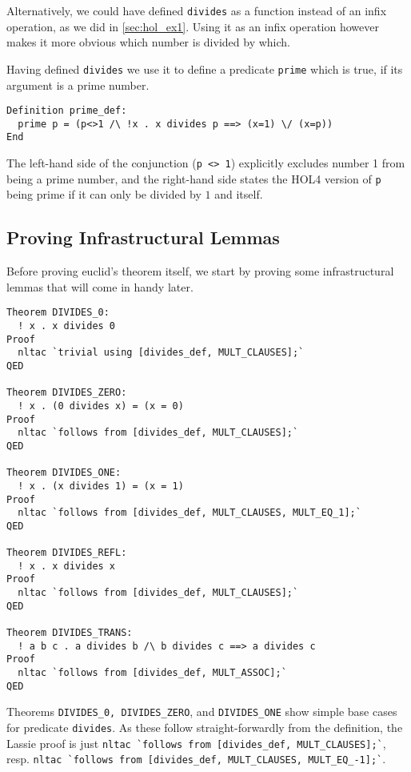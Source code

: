 \documentclass[10pt]{scrartcl}
\begin{document}
Alternatively, we could have defined \lstinline{divides} as a function instead
of an infix operation, as we did in \autoref{sec:hol_ex1}.
Using it as an infix operation however makes it more obvious which number is
divided by which.

Having defined \lstinline{divides} we use it to define a predicate
\lstinline{prime} which is true, if its argument is a prime number.
\begin{lstlisting}
Definition prime_def:
  prime p = (p<>1 /\ !x . x divides p ==> (x=1) \/ (x=p))
End
\end{lstlisting}

The left-hand side of the conjunction (\lstinline{p <> 1}) explicitly excludes
number 1 from being a prime number, and the right-hand side states the HOL4
version of \lstinline{p} being prime if it can only be divided by $1$ and itself.

\subsection{Proving Infrastructural Lemmas}

Before proving euclid's theorem itself, we start by proving some infrastructural
lemmas that will come in handy later.
\begin{lstlisting}
Theorem DIVIDES_0:
  ! x . x divides 0
Proof
  nltac `trivial using [divides_def, MULT_CLAUSES];`
QED

Theorem DIVIDES_ZERO:
  ! x . (0 divides x) = (x = 0)
Proof
  nltac `follows from [divides_def, MULT_CLAUSES];`
QED

Theorem DIVIDES_ONE:
  ! x . (x divides 1) = (x = 1)
Proof
  nltac `follows from [divides_def, MULT_CLAUSES, MULT_EQ_1];`
QED

Theorem DIVIDES_REFL:
  ! x . x divides x
Proof
  nltac `follows from [divides_def, MULT_CLAUSES];`
QED

Theorem DIVIDES_TRANS:
  ! a b c . a divides b /\ b divides c ==> a divides c
Proof
  nltac `follows from [divides_def, MULT_ASSOC];`
QED
\end{lstlisting}

Theorems \lstinline{DIVIDES_0, DIVIDES_ZERO}, and \lstinline{DIVIDES_ONE} show
simple base cases for predicate \lstinline{divides}.
As these follow straight-forwardly from the definition, the Lassie proof is just
\lstinline{nltac `follows from [divides_def, MULT_CLAUSES];`}, resp.
\lstinline{nltac `follows from [divides_def, MULT_CLAUSES, MULT_EQ_-1];`}.
\end{document}
